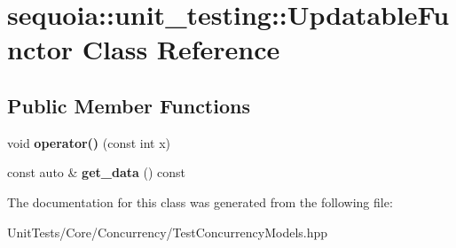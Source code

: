 \hypertarget{classsequoia_1_1unit__testing_1_1_updatable_functor}{}\section{sequoia\+::unit\+\_\+testing\+::Updatable\+Functor Class Reference}
\label{classsequoia_1_1unit__testing_1_1_updatable_functor}
\subsection*{Public Member Functions}
\begin{DoxyCompactItemize}
\item 
\mbox{\label{classsequoia_1_1unit__testing_1_1_updatable_functor_aac28dca9362b8518866ad951d5f62f59}} 
void {\bfseries operator()} (const int x)
\item 
\mbox{\label{classsequoia_1_1unit__testing_1_1_updatable_functor_ac5633d75dcb89c0acfc8b56a38165073}} 
const auto \& {\bfseries get\+\_\+data} () const
\end{DoxyCompactItemize}


The documentation for this class was generated from the following file\+:\begin{DoxyCompactItemize}
\item 
Unit\+Tests/\+Core/\+Concurrency/Test\+Concurrency\+Models.\+hpp\end{DoxyCompactItemize}
